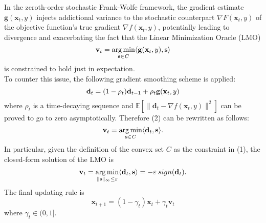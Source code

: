 In the zeroth-order stochastic Frank-Wolfe framework, the gradient estimate $\mathbf{g}(\mathbf{x}_t,y)$ injects addictional variance to the stochastic counterpart $\nabla F(\mathbf{x}_t,y)$ of the objective function's true gradient $\nabla f(\mathbf{x}_{t},y)$, potentially leading to divergence and exacerbating the fact that the Linear Minimization Oracle (LMO)
\begin{equation}
	\mathbf{v}_t = \operatorname*{arg\,min}_{\mathbf{s}\in\mathit{C}}\langle \mathbf{g}(\mathbf{x}_t,y),\mathbf{s}\rangle	
\end{equation}
is constrained to hold just in expectation.\\ 
To counter this issue, the following gradient smoothing scheme is applied:
\begin{equation}
	\mathbf{d}_{t} = (1-\rho_t)\mathbf{d}_{t-1} + \rho_t\mathbf{g}(\mathbf{x}_t,y)\\
\end{equation}
where $\rho_t$ is a time-decaying sequence and $\mathbb{E}[\lVert\mathbf{d}_{t}-\nabla f(\mathbf{x}_{t},y) \rVert^2]$ can be proved to go to zero asymptotically. Therefore (2) can be rewritten as follows:
\begin{equation}
	\mathbf{v}_t = \operatorname*{arg\,min}_{\mathbf{s}\in\mathit{C}}\langle \mathbf{d}_t,\mathbf{s}\rangle.
\end{equation}
In particular, given the definition of the convex set $\mathit{C}$ as the constraint in (1), the closed-form solution of the LMO is 
\begin{equation}
	\mathbf{v}_t = \operatorname*{arg\,min}_{\lVert \mathbf{s}\rVert_{\infty}\leq\varepsilon}\langle \mathbf{d}_t,\mathbf{s}\rangle= -\varepsilon \:sign(\mathbf{d}_{t}).	
\end{equation}
The final updating rule is
\begin{equation}
	\mathbf{x}_{t+1} = (1-\gamma_t)\mathbf{x}_t + \gamma_t\mathbf{v}_t
\end{equation}
where $\gamma_t\in(0,1]$.